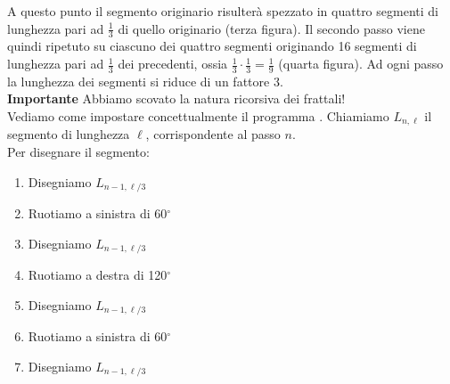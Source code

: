 A questo punto il segmento originario risulterà spezzato in quattro segmenti di lunghezza pari ad $\frac{1}{3}$ di quello originario (terza figura). Il secondo passo viene quindi ripetuto su ciascuno dei quattro segmenti originando 16 segmenti di lunghezza pari ad $\frac{1}{3}$ dei precedenti, ossia $\frac{1}{3} \cdot \frac{1}{3} = \frac{1}{9}$ (quarta figura). Ad ogni  passo la lunghezza dei segmenti si riduce di un fattore 3.\\
\textbf{Importante} Abbiamo scovato la natura ricorsiva dei frattali! \\
Vediamo come impostare concettualmente il programma \logo. Chiamiamo $L_{n,\ell}$ il segmento di lunghezza $\ell$, corrispondente al passo $n$.\\
Per disegnare il segmento:
\begin{enumerate}
	\item Disegniamo $L_{n-1,\ell/3}$
	\item Ruotiamo a sinistra di 60$^{\circ}$
	\item Disegniamo $L_{n-1,\ell/3}$
	\item Ruotiamo a destra di 120$^{\circ}$
	\item Disegniamo $L_{n-1,\ell/3}$
	\item Ruotiamo a sinistra di 60$^{\circ}$
	\item Disegniamo $L_{n-1,\ell/3}$
\end{enumerate}

